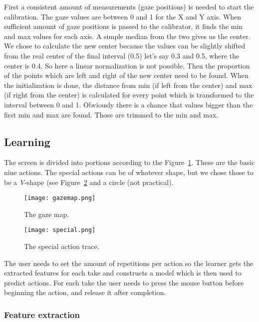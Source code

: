 \documentclass[a4paper,11pt]{article}
\begin{document}
First a consistent amount of measurements (gaze positions) is needed to start the calibration. The gaze values are between 0 and 1 for the X and Y axis. When sufficient amount of gaze positions is passed to the calibrator, it finds the min and max values for each axis. A simple median from the two gives us the center. We chose to calculate the new center because the values can be slightly shifted from the real center of the final interval (0.5) let's say 0.3 and 0.5, where the center is 0.4. So here a linear normalization is not possible. Then the proportion of the points which are left and right of the new center need to be found. When the initialization is done, the distance from min (if left from the center) and max (if right from the center) is calculated for every point which is transformed to the interval between 0 and 1. Obviously there is a chance that values bigger than the first min and max are found. Those are trimmed to the min and max.

\subsection{Learning}

The screen is divided into portions according to the Figure~\ref{map}. These are the basic nine actions. The special actions can be of whatever shape, but we chose those to be a \emph{V}-shape (see Figure~\ref{special} and a circle (not practical). 

\begin{figure}[htbp]
\begin{center}
\texttt{[image: gazemap.png]}
\caption{The gaze map.}
\label{map}
\end{center}
\end{figure} 

\begin{figure}[htbp]
\begin{center}
\texttt{[image: special.png]}
\caption{The special action trace.}
\label{special}
\end{center}
\end{figure}

The user needs to set the amount of repetitions per action so the learner gets the extracted features for each take and constructs a model which is then used to predict actions. For each take the user needs to press the mouse button before beginning the action, and release it after completion. 

\subsubsection{Feature extraction}
\end{document}
